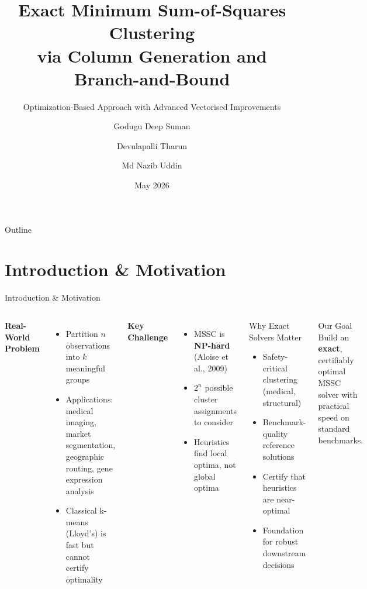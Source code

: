 \documentclass[aspectratio=169,12pt]{beamer}
\title[MSSC Exact Solver]{Exact Minimum Sum-of-Squares Clustering\\via Column Generation and Branch-and-Bound}
\subtitle{Optimization-Based Approach with Advanced Vectorised Improvements}
\author[Godugu \and Devulapalli \and Md Nazib]{%
  Godugu Deep Suman \and Devulapalli Tharun \and Md Nazib Uddin}
\institute[NITK Surathkal]{%
  Department of Computer Science and Engineering\\
  National Institute of Technology Karnataka, Surathkal}
\date{May 2026}
\begin{document}

\begin{frame}[plain]
  \titlepage
\end{frame}

\begin{frame}{Outline}
  \tableofcontents
\end{frame}

\section{Introduction \& Motivation}

\begin{frame}{Introduction \& Motivation}
  \begin{columns}[T]
      \textbf{Real-World Problem}
      \begin{itemize}
        \item Partition $n$ observations into $k$ meaningful groups
        \item Applications: medical imaging, market segmentation, geographic routing, gene expression analysis
        \item Classical k-means (Lloyd's) is fast but \alert{cannot certify optimality}
      \end{itemize}
      \vspace{0.4em}
      \textbf{Key Challenge}
      \begin{itemize}
        \item MSSC is \textbf{NP-hard} (Aloise et al., 2009)
        \item $2^n$ possible cluster assignments to consider
        \item Heuristics find local optima, not global optima
      \end{itemize}

      \begin{block}{Why Exact Solvers Matter}
        \begin{itemize}
          \item Safety-critical clustering (medical, structural)
          \item Benchmark-quality reference solutions
          \item Certify that heuristics are near-optimal
          \item Foundation for robust downstream decisions
        \end{itemize}
      \end{block}
      \vspace{0.3em}
      \begin{alertblock}{Our Goal}
        Build an \textbf{exact}, certifiably optimal MSSC solver with practical speed on standard benchmarks.
      \end{alertblock}
  \end{columns}
\end{frame}
\end{document}
